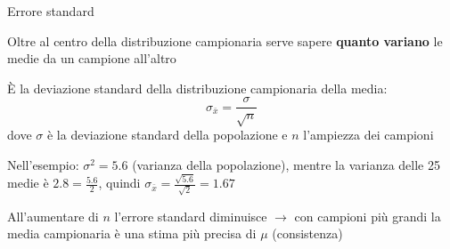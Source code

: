 \documentclass[
  ignorenonframetext,
  compress, aspectratio=149]{beamer}
\begin{document}
\begin{frame}{Errore standard}
\label{errore-standard}
\footnotesize

Oltre al centro della distribuzione campionaria serve sapere
\textbf{quanto variano} le medie da un campione all'altro

\begin{tcolorbox}[enhanced jigsaw, opacityback=0, bottomtitle=1mm, bottomrule=.15mm, titlerule=0mm, coltitle=black, toprule=.15mm, breakable, toptitle=1mm, colbacktitle=quarto-callout-tip-color!10!white, arc=.35mm, title={Errore standard della media}, rightrule=.15mm, leftrule=.75mm, opacitybacktitle=0.6, left=2mm, colframe=quarto-callout-tip-color-frame, colback=white]

È la deviazione standard della distribuzione campionaria della media:
\[\sigma_{\bar{x}} = \frac{\sigma}{\sqrt{n}}\] dove \(\sigma\) è la
deviazione standard della popolazione e \(n\) l'ampiezza dei campioni

\end{tcolorbox}

Nell'esempio: \(\sigma^2 = 5.6\) (varianza della popolazione), mentre la
varianza delle 25 medie è \(2.8 = \frac{5.6}{2}\), quindi
\(\sigma_{\bar{x}} = \frac{\sqrt{5.6}}{\sqrt{2}} = 1.67\)

\vspace{2mm}

All'aumentare di \(n\) l'errore standard diminuisce
\textcolor{evid}{$\rightarrow$} con campioni più grandi la media
campionaria è una stima più precisa di \(\mu\) (consistenza)
\end{frame}
\end{document}
